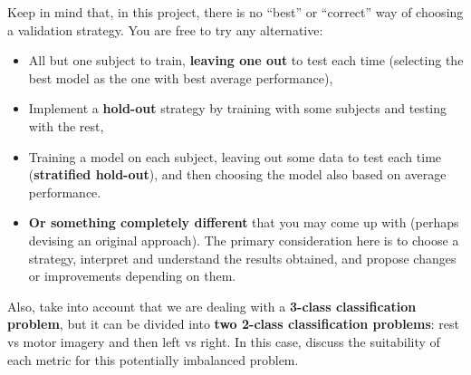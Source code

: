 \documentclass[11pt]{exam}
\begin{document}
\begin{itemize}
        Keep in mind that, in this project, there is no “best” or “correct” way of choosing a validation strategy. You are free to try any alternative:
        \begin{itemize}
            \item All but one subject to train, \textbf{leaving one out} to test each time (selecting the best model as the one with best average performance),
            \item Implement a \textbf{hold-out} strategy by training with some subjects and testing with the rest,
            \item Training a model on each subject, leaving out some data to test each time (\textbf{stratified hold-out}), and then choosing the model also based on average performance.
            \item \textbf{Or something completely different} that you may come up with (perhaps devising an original approach). %
            The primary consideration here is to choose a strategy, interpret and understand the results obtained, and propose changes or improvements depending on them.
        \end{itemize}
        Also, take into account that we are dealing with a \textbf{3-class classification problem}, but it can be divided into \textbf{two 2-class classification problems}: rest vs motor imagery and then left vs right. In this case, discuss the suitability of each metric for this potentially imbalanced problem.
    \end{itemize}
\end{document}
